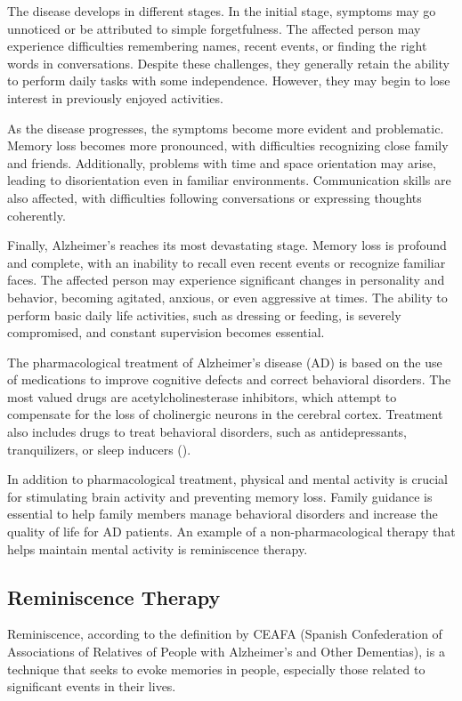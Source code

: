 The disease develops in different stages. In the initial stage, symptoms may go unnoticed or be attributed to simple forgetfulness. The affected person may experience difficulties remembering names, recent events, or finding the right words in conversations. Despite these challenges, they generally retain the ability to perform daily tasks with some independence. However, they may begin to lose interest in previously enjoyed activities.

As the disease progresses, the symptoms become more evident and problematic. Memory loss becomes more pronounced, with difficulties recognizing close family and friends. Additionally, problems with time and space orientation may arise, leading to disorientation even in familiar environments. Communication skills are also affected, with difficulties following conversations or expressing thoughts coherently.

Finally, Alzheimer's reaches its most devastating stage. Memory loss is profound and complete, with an inability to recall even recent events or recognize familiar faces. The affected person may experience significant changes in personality and behavior, becoming agitated, anxious, or even aggressive at times. The ability to perform basic daily life activities, such as dressing or feeding, is severely compromised, and constant supervision becomes essential.

The pharmacological treatment of Alzheimer's disease (AD) is based on the use of medications to improve cognitive defects and correct behavioral disorders. The most valued drugs are acetylcholinesterase inhibitors, which attempt to compensate for the loss of cholinergic neurons in the cerebral cortex. Treatment also includes drugs to treat behavioral disorders, such as antidepressants, tranquilizers, or sleep inducers (\cite{chung2000neurobehavioral}).

In addition to pharmacological treatment, physical and mental activity is crucial for stimulating brain activity and preventing memory loss. Family guidance is essential to help family members manage behavioral disorders and increase the quality of life for AD patients. An example of a non-pharmacological therapy that helps maintain mental activity is reminiscence therapy.

\subsection{Reminiscence Therapy}
Reminiscence, according to the definition by CEAFA (Spanish Confederation of Associations of Relatives of People with Alzheimer's and Other Dementias), is a technique that seeks to evoke memories in people, especially those related to significant events in their lives.

